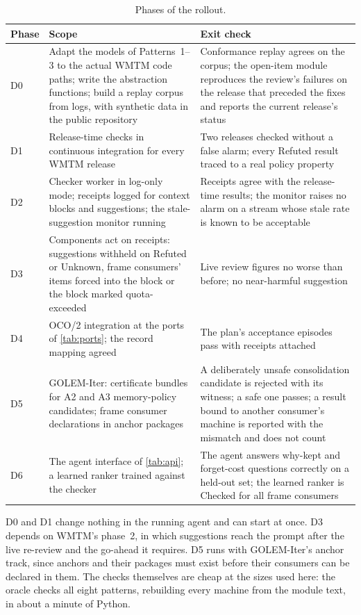 \documentclass[11pt]{article}
\theoremstyle{definition}
\theoremstyle{plain}
\begin{document}
\begin{table}[ht]
\centering\small
\begin{tabularx}{\textwidth}{>{\raggedright\arraybackslash}p{1.0cm}>{\raggedright\arraybackslash}p{4.6cm}X}
\toprule
Phase & Scope & Exit check\\
\midrule
D0 & Adapt the models of Patterns~1--3 to the actual WMTM code paths; write the abstraction
functions; build a replay corpus from logs, with synthetic data in the public repository &
Conformance replay agrees on the corpus; the open-item module reproduces the review's failures on
the release that preceded the fixes and reports the current release's status\\
D1 & Release-time checks in continuous integration for every WMTM release & Two releases checked
without a false alarm; every Refuted result traced to a real policy property\\
D2 & Checker worker in log-only mode; receipts logged for context blocks and suggestions; the
stale-suggestion monitor running & Receipts agree with the release-time results; the monitor
raises no alarm on a stream whose stale rate is known to be acceptable\\
D3 & Components act on receipts: suggestions withheld on Refuted or Unknown, frame consumers'
items forced into the block or the block marked quota-exceeded & Live review figures no worse than
before; no near-harmful suggestion\\
D4 & OCO/2 integration at the ports of \cref{tab:ports}; the record mapping agreed & The plan's
acceptance episodes pass with receipts attached\\
D5 & GOLEM-Iter: certificate bundles for A2 and A3 memory-policy candidates; frame consumer
declarations in anchor packages & A deliberately unsafe consolidation candidate is rejected with
its witness; a safe one passes; a result bound to another consumer's machine is reported with the
mismatch and does not count\\
D6 & The agent interface of \cref{tab:api}; a learned ranker trained against the checker & The
agent answers why-kept and forget-cost questions correctly on a held-out set; the learned ranker
is Checked for all frame consumers\\
\bottomrule
\end{tabularx}
\caption{Phases of the rollout.}\label{tab:rollout}
\end{table}

D0 and D1 change nothing in the running agent and can start at once. D3 depends on WMTM's phase~2,
in which suggestions reach the prompt after the live re-review and the go-ahead it requires. D5
runs with GOLEM-Iter's anchor track, since anchors and their packages must exist before their
consumers can be declared in them. The checks themselves are cheap at the sizes used here: the
oracle checks all eight patterns, rebuilding every machine from the module text, in about a minute
of Python.
\end{document}

